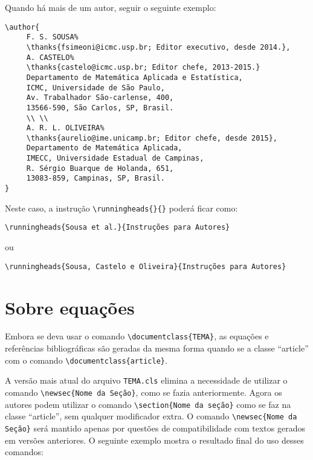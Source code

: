 \documentclass{TEMA}
\begin{document}
Quando há mais de um autor, seguir o seguinte exemplo:  

\newpage

\begin{framed}
\begin{verbatim}
\author{
     F. S. SOUSA%
     \thanks{fsimeoni@icmc.usp.br; Editor executivo, desde 2014.},
     A. CASTELO%
     \thanks{castelo@icmc.usp.br; Editor chefe, 2013-2015.}
     Departamento de Matemática Aplicada e Estatística,
     ICMC, Universidade de São Paulo, 
     Av. Trabalhador São-carlense, 400, 
     13566-590, São Carlos, SP, Brasil.
     \\ \\
     A. R. L. OLIVEIRA%
     \thanks{aurelio@ime.unicamp.br; Editor chefe, desde 2015},
     Departamento de Matemática Aplicada,
     IMECC, Universidade Estadual de Campinas,
     R. Sérgio Buarque de Holanda, 651, 
     13083-859, Campinas, SP, Brasil. 
}
\end{verbatim}
\end{framed}

Neste caso, a instrução \verb!\runningheads{}{}! poderá ficar como: 
\begin{framed}
\begin{verbatim}
\runningheads{Sousa et al.}{Instruções para Autores}
\end{verbatim}
\end{framed}
\noindent ou
\begin{framed}
\begin{verbatim}
\runningheads{Sousa, Castelo e Oliveira}{Instruções para Autores}
\end{verbatim}
\end{framed}



\section{Sobre equações}

Embora se deva usar o comando \verb!\documentclass{TEMA}!, as
equações e referências bibliográficas são geradas da mesma forma
quando se a classe ``article'' com o comando  \verb!\documentclass{article}!.

A versão mais atual do arquivo \texttt{TEMA.cls} elimina a necessidade
de utilizar o comando \verb!\newsec{Nome da Seção}!, como se fazia
anteriormente. Agora os autores podem utilizar o comando
\verb!\section{Nome da seção}! como se faz na classe ``article'',
sem qualquer modificador extra.
O comando \verb!\newsec{Nome da Seção}! será mantido apenas por
questões de compatibilidade com textos gerados em versões anteriores.
O seguinte exemplo mostra o resultado final do uso desses comandos: 
\end{document}
